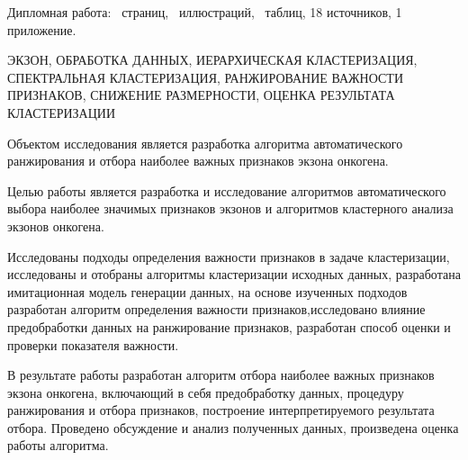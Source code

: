 Дипломная работа: \ страниц, \totalfigures{}~иллюстраций, \totaltables{}\ таблиц,
18 источников, 1 приложение.

\vspace{\baselineskip}

ЭКЗОН, ОБРАБОТКА ДАННЫХ, ИЕРАРХИЧЕСКАЯ КЛАСТЕРИЗАЦИЯ, СПЕКТРАЛЬНАЯ КЛАСТЕРИЗАЦИЯ, РАНЖИРОВАНИЕ ВАЖНОСТИ ПРИЗНАКОВ, СНИЖЕНИЕ РАЗМЕРНОСТИ, ОЦЕНКА РЕЗУЛЬТАТА КЛАСТЕРИЗАЦИИ

\vspace{\baselineskip}

Объектом исследования является разработка алгоритма автоматического ранжирования и отбора наиболее важных признаков экзона онкогена.

Целью работы является разработка и исследование алгоритмов автоматического выбора наиболее значимых признаков экзонов и алгоритмов кластерного анализа экзонов онкогена.

Исследованы подходы определения важности признаков в задаче кластеризации, исследованы и отобраны алгоритмы кластеризации исходных данных, разработана имитационная модель генерации данных, на основе изученных подходов разработан алгоритм определения важности признаков,исследовано влияние предобработки данных на ранжирование признаков, разработан способ оценки и проверки показателя важности.

В результате работы разработан алгоритм отбора наиболее важных признаков экзона онкогена, включающий в себя предобработку данных, процедуру ранжирования и отбора признаков, построение интерпретируемого результата отбора. Проведено обсуждение и анализ полученных данных, произведена оценка работы алгоритма.
